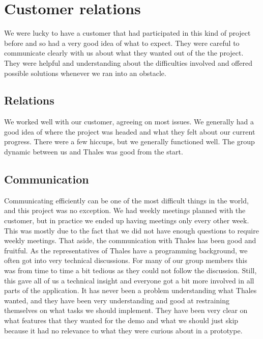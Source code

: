 \section{Customer relations}\label{sec:refl_customer}
We were lucky to have a customer that had participated in this kind of project before and so had a very good idea of what to expect. They were careful to communicate clearly with us about what they wanted out of the the project. They were helpful and understanding about the difficulties involved and offered possible solutions whenever we ran into an obstacle.
\subsection{Relations}
We worked well with our customer, agreeing on most issues. We generally had a good idea of where the project was headed and what they felt about our current progress. There were a few hiccups, but we generally functioned well. The group dynamic between us and Thales was good from the start.

\subsection{Communication}
Communicating efficiently can be one of the most difficult things in the world, and this project was no exception. We had weekly meetings planned with the customer, but in practice we ended up having meetings only every other week. This was mostly due to the fact that we did not have enough questions to require weekly meetings.
\newline
\newline
That aside, the communication with Thales has been good and fruitful. As the representatives of Thales have a programming background, we often got into very technical discussions. For many of our group members this was from time to time a bit tedious as they could not follow the discussion. Still, this gave all of us a technical insight and everyone got a bit more involved in all parts of the application. It has never been a problem understanding what Thales wanted, and they have been very understanding and good at restraining themselves on what tasks we should implement. They have been very clear on what features that they wanted for the demo and what we should just skip because it had no relevance to what they were curious about in a prototype.

